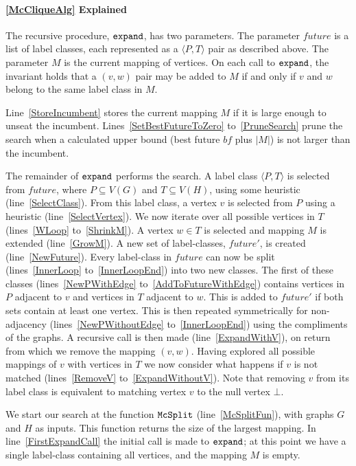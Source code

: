 \documentclass[letterpaper]{article}
\newcommand{\AlgVar}[1]{\mathit{#1}}
\newcommand{\lineref}[1]{line~\ref{#1}}
\newcommand{\linerangeref}[2]{lines~\ref{#1} to~\ref{#2}}
\newcommand{\Lineref}[1]{Line~\ref{#1}}
\newcommand{\Linerangeref}[2]{Lines~\ref{#1} to~\ref{#2}}
\begin{document}
\paragraph{\cref{McCliqueAlg} Explained} The recursive procedure, $\FuncSty{expand}$, has
two parameters.  The parameter $\AlgVar{future}$ is a list of label classes,
each represented as a $\langle P, T \rangle$ pair as described above.  The
parameter $M$ is the current mapping of vertices.  On each call to
$\FuncSty{expand}$, the invariant holds that a $(v,w)$ pair may be added to $M$
if and only if $v$ and $w$ belong to the same label class in $M$.

\Lineref{StoreIncumbent} stores the current mapping $M$ if it is large enough
to unseat the incumbent.  \Linerangeref{SetBestFutureToZero}{PruneSearch} prune
the search when a calculated upper bound (best future $\AlgVar{bf}$ plus $|M|$) is not larger
than the incumbent.

The remainder of $\FuncSty{expand}$ performs the search.  A label class
$\langle P, T \rangle$ is selected from $\AlgVar{future}$, where $P \subseteq V(G)$ and $T \subseteq V(H)$,
using some heuristic (\lineref{SelectClass}).  From this label class, a
vertex $v$ is selected from $P$ using a heuristic (\lineref{SelectVertex}). We now
iterate over all possible vertices in $T$ (\linerangeref{WLoop}{ShrinkM}). A
vertex $w \in T$ is selected and mapping $M$ is extended (\lineref{GrowM}). A
new set of label-classes, $\AlgVar{future'}$, is created (\lineref{NewFuture}).
Every label-class in $\AlgVar{future}$ can now be split
(\linerangeref{InnerLoop}{InnerLoopEnd}) into two new classes. The first of
these classes (\linerangeref{NewPWithEdge}{AddToFutureWithEdge}) contains
vertices in $P$ adjacent to $v$ and vertices in $T$ adjacent to $w$.  This is
added to $\AlgVar{future'}$ if both sets contain at least one vertex.  This is
then repeated symmetrically for non-adjacency
(\linerangeref{NewPWithoutEdge}{InnerLoopEnd}) using the compliments of the
graphs.  A recursive call is then made (\lineref{ExpandWithV}), on return from
which we remove the mapping $(v,w)$.  Having explored all possible mappings of
$v$ with vertices in $T$ we now consider what happens if $v$ is not matched
(\linerangeref{RemoveV}{ExpandWithoutV}). Note that removing $v$ from its label
class is equivalent to matching vertex $v$ to the null vertex $\bot$.

We start our search at the function $\FuncSty{McSplit}$ (\lineref{McSplitFun}),
with graphs $G$ and $H$ as inputs.  This function returns the size of the
largest mapping.  In \lineref{FirstExpandCall} the initial call is made to
$\FuncSty{expand}$; at this point we have a single label-class containing all
vertices, and the mapping $M$ is empty.
\end{document}
